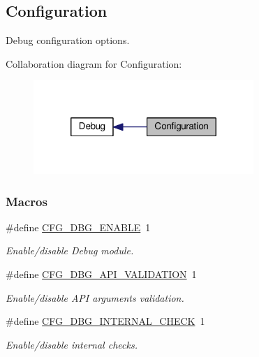\hypertarget{group__dbg__cfg}{\subsection{Configuration}
\label{group__dbg__cfg}
}


Debug configuration options.  


Collaboration diagram for Configuration\-:\nopagebreak
\begin{figure}[H]
\begin{center}
\leavevmode
\includegraphics[width=236pt]{group__dbg__cfg}
\end{center}
\end{figure}
\subsubsection*{Macros}
\begin{DoxyCompactItemize}
\item 
\#define \hyperlink{group__dbg__cfg_ga2ee37a5fa7efdba7d0014328e6c623a8}{C\-F\-G\-\_\-\-D\-B\-G\-\_\-\-E\-N\-A\-B\-L\-E}~1
\begin{DoxyCompactList}\small\item\em Enable/disable Debug module. \end{DoxyCompactList}\item 
\#define \hyperlink{group__dbg__cfg_ga64e39c477ef9d900b82585150329e3f0}{C\-F\-G\-\_\-\-D\-B\-G\-\_\-\-A\-P\-I\-\_\-\-V\-A\-L\-I\-D\-A\-T\-I\-O\-N}~1
\begin{DoxyCompactList}\small\item\em Enable/disable A\-P\-I arguments validation. \end{DoxyCompactList}\item 
\#define \hyperlink{group__dbg__cfg_ga530daa344716eca7cf87075dd7a8fca1}{C\-F\-G\-\_\-\-D\-B\-G\-\_\-\-I\-N\-T\-E\-R\-N\-A\-L\-\_\-\-C\-H\-E\-C\-K}~1
\begin{DoxyCompactList}\small\item\em Enable/disable internal checks. \end{DoxyCompactList}\end{DoxyCompactItemize}


